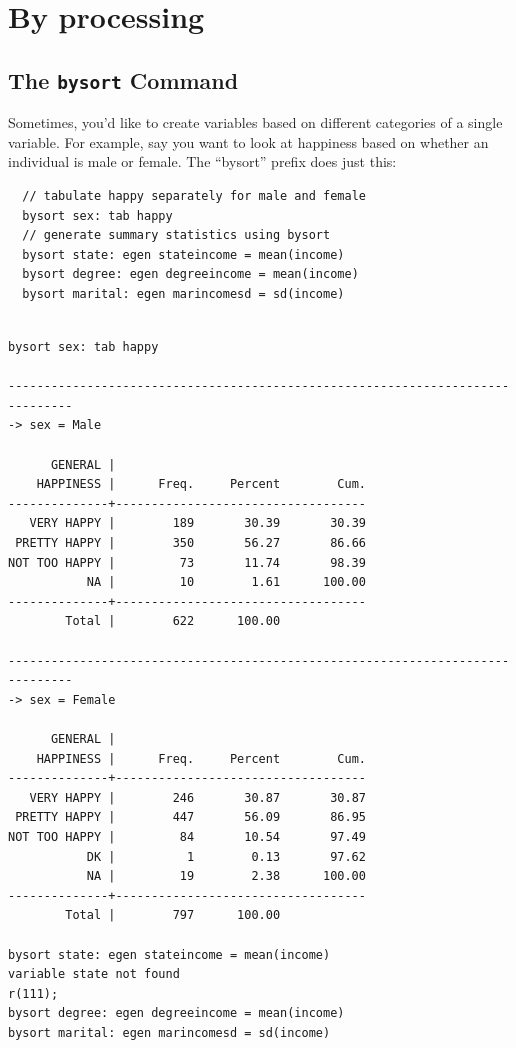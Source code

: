\documentclass[]{book}
\begin{document}
\hypertarget{by-processing}{%
\section{By processing}\label{by-processing}}

\hypertarget{the-bysort-command}{%
\subsection{\texorpdfstring{The \texttt{bysort} Command}{The bysort Command}}\label{the-bysort-command}}

Sometimes, you'd like to create variables based on different categories of a single variable. For example, say you want to look at happiness based on whether an individual is male or female. The ``bysort'' prefix does just this:

\begin{verbatim}
  // tabulate happy separately for male and female 
  bysort sex: tab happy
  // generate summary statistics using bysort 
  bysort state: egen stateincome = mean(income)
  bysort degree: egen degreeincome = mean(income)
  bysort marital: egen marincomesd = sd(income)
\end{verbatim}

\begin{verbatim}

bysort sex: tab happy

-------------------------------------------------------------------------------
-> sex = Male

      GENERAL |
    HAPPINESS |      Freq.     Percent        Cum.
--------------+-----------------------------------
   VERY HAPPY |        189       30.39       30.39
 PRETTY HAPPY |        350       56.27       86.66
NOT TOO HAPPY |         73       11.74       98.39
           NA |         10        1.61      100.00
--------------+-----------------------------------
        Total |        622      100.00

-------------------------------------------------------------------------------
-> sex = Female

      GENERAL |
    HAPPINESS |      Freq.     Percent        Cum.
--------------+-----------------------------------
   VERY HAPPY |        246       30.87       30.87
 PRETTY HAPPY |        447       56.09       86.95
NOT TOO HAPPY |         84       10.54       97.49
           DK |          1        0.13       97.62
           NA |         19        2.38      100.00
--------------+-----------------------------------
        Total |        797      100.00

bysort state: egen stateincome = mean(income)
variable state not found
r(111);
bysort degree: egen degreeincome = mean(income)
bysort marital: egen marincomesd = sd(income)
\end{verbatim}
\end{document}
